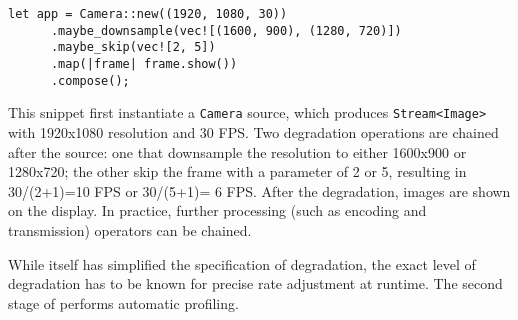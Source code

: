 \vspace{-2pt}
\begin{lstlisting}[caption={Video Processing Example}, label={lst:ex}]
   let app = Camera::new((1920, 1080, 30))
      .maybe_downsample(vec![(1600, 900), (1280, 720)])
      .maybe_skip(vec![2, 5])
      .map(|frame| frame.show())
      .compose();
\end{lstlisting}

This snippet first instantiate a \texttt{Camera} source, which produces
\texttt{Stream<Image>} with 1920x1080 resolution and 30 FPS. Two degradation
operations are chained after the source: one that downsample the resolution to
either 1600x900 or 1280x720; the other skip the frame with a parameter of 2 or
5, resulting in 30/(2+1)=10 FPS or 30/(5+1)= 6 FPS. After the degradation,
images are shown on the display. In practice, further processing (such as
encoding and transmission) operators can be chained.

While \maybe{} itself has simplified the specification of degradation, the exact
level of degradation has to be known for precise rate adjustment at runtime. The
second stage of \sysname{} performs automatic profiling.

